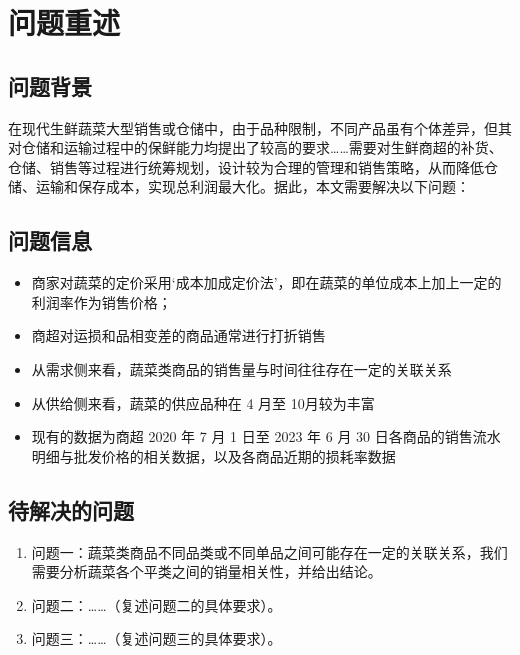 \documentclass[a4paper, zihao=-4, fontset=windows]{ctexart}
\begin{document}
\newpage


\section{问题重述}

\subsection{问题背景}
在现代生鲜蔬菜大型销售或仓储中，由于品种限制，不同产品虽有个体差异，但其对仓储和运输过程中的保鲜能力均提出了较高的要求……需要对生鲜商超的补货、仓储、销售等过程进行统筹规划，设计较为合理的管理和销售策略，从而降低仓储、运输和保存成本，实现总利润最大化。据此，本文需要解决以下问题：

\subsection{问题信息}
\begin{itemize}
  \item 商家对蔬菜的定价采用‘成本加成定价法’，即在蔬菜的单位成本上加上一定的利润率作为销售价格；
  \item 商超对运损和品相变差的商品通常进行打折销售
  \item 从需求侧来看，蔬菜类商品的销售量与时间往往存在一定的关联关系
  \item 从供给侧来看，蔬菜的供应品种在 4 月至 10月较为丰富
  \item 现有的数据为商超 2020 年 7 月 1 日至 2023 年 6 月 30 日各商品的销售流水明细与批发价格的相关数据，以及各商品近期的损耗率数据
\end{itemize}

\subsection{待解决的问题}
\begin{enumerate}
  \item 问题一：蔬菜类商品不同品类或不同单品之间可能存在一定的关联关系，我们需要分析蔬菜各个平类之间的销量相关性，并给出结论。
  \item 问题二：……（复述问题二的具体要求）。
  \item 问题三：……（复述问题三的具体要求）。
\end{enumerate}
\end{document}
